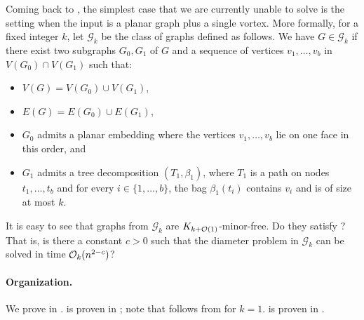 Coming back to ,
the simplest case
that we are currently unable to solve is the setting when the input is a planar graph plus a single vortex. More formally, for a fixed integer $k$, let $\mathcal{G}_k$ be the class of graphs
defined as follows. We have $G \in \mathcal{G}_k$ if there exist two subgraphs $G_0,G_1$
of $G$ and a sequence of vertices $v_1,\ldots,v_b$ in $V(G_0) \cap V(G_1)$
such that:
\begin{itemize}[nosep]
 \item $V(G) = V(G_0) \cup V(G_1)$,
 \item $E(G) = E(G_0) \cup E(G_1)$,
 \item $G_0$ admits a planar embedding where the vertices $v_1,\ldots,v_b$ lie on one face in
this order, and
\item $G_1$ admits a tree decomposition $(T_1,\beta_1)$, where $T_1$ is a path on nodes $t_1,\ldots,t_b$ and for every $i\in\{1,\ldots,b\}$, the bag $\beta_1(t_i)$ contains $v_i$
and is of size at most $k$.
\end{itemize}
It is easy to see that graphs from $\mathcal{G}_k$ are $K_{k+\mathcal{O}(1)}$-minor-free.
Do they satisfy ? That is, is there a constant
$c > 0$ such that the diameter problem in $\mathcal{G}_k$ can be solved in
time $\mathcal{O}_k(n^{2-c})$?

\paragraph{Organization.}
We prove  in .
 is proven in ; note that  follows from 
for $k=1$. 
 is proven in .

